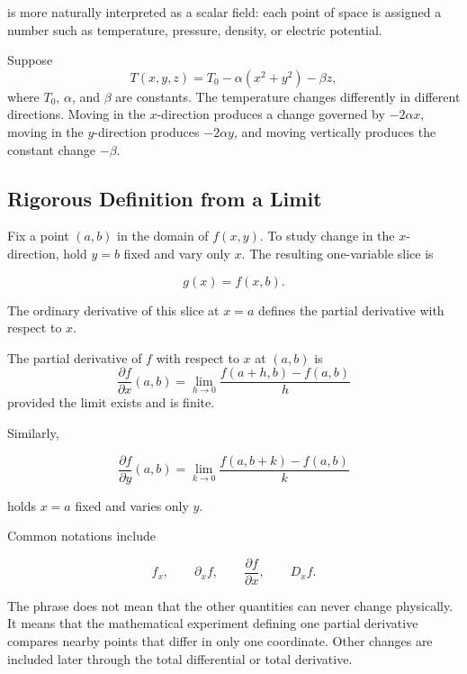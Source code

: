 is more naturally interpreted as a scalar field: each point of space is assigned a number such as temperature, pressure, density, or electric potential.

\begin{bookexample}
Suppose
\[
T(x,y,z)=T_0-\alpha(x^2+y^2)-\beta z,
\]
where $T_0$, $\alpha$, and $\beta$ are constants. The temperature changes differently in different directions. Moving in the $x$-direction produces a change governed by $-2\alpha x$, moving in the $y$-direction produces $-2\alpha y$, and moving vertically produces the constant change $-\beta$.
\end{bookexample}

\subsection{Rigorous Definition from a Limit}

Fix a point $(a,b)$ in the domain of $f(x,y)$. To study change in the $x$-direction, hold $y=b$ fixed and vary only $x$. The resulting one-variable slice is

\[
g(x)=f(x,b).
\]

The ordinary derivative of this slice at $x=a$ defines the partial derivative with respect to $x$.

\begin{bookdefinition}
The partial derivative of $f$ with respect to $x$ at $(a,b)$ is
\begin{equation}
\boxed{
\frac{\partial f}{\partial x}(a,b)
=
\lim_{h\to0}
\frac{f(a+h,b)-f(a,b)}{h}
}
\label{eq:partial-x-limit}
\end{equation}
provided the limit exists and is finite.
\end{bookdefinition}

Similarly,

\begin{equation}
\boxed{
\frac{\partial f}{\partial y}(a,b)
=
\lim_{k\to0}
\frac{f(a,b+k)-f(a,b)}{k}
}
\label{eq:partial-y-limit}
\end{equation}

holds $x=a$ fixed and varies only $y$.

Common notations include

\[
f_x,
\qquad
\partial_x f,
\qquad
\frac{\partial f}{\partial x},
\qquad
D_xf.
\]

\begin{bookremark}
The phrase does not mean that the other quantities can never change physically. It means that the mathematical experiment defining one partial derivative compares nearby points that differ in only one coordinate. Other changes are included later through the total differential or total derivative.
\end{bookremark}

